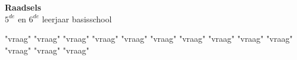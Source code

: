 \documentclass[12pt, a4paper]{article}
\begin{document}
	\begin{center}
		\Huge
		\textbf{Raadsels} \\
		\Large
		$5^{de}$ en $6^{de}$ leerjaar basisschool
	\end{center}
	
	{"vraag"}
	{"vraag"}
	{"vraag"}
	{"vraag"}
	{"vraag"}
	{"vraag"}
	{"vraag"}
	{"vraag"}
	{"vraag"}
	{"vraag"}
	{"vraag"}
	{"vraag"}
	{"vraag"}
\end{document}
